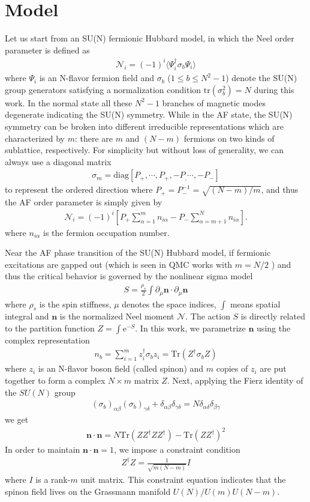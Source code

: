 \documentclass[aps,twocolumn,superscriptaddress]{revtex4-1}
\newcommand{\bea}{\begin{eqnarray}}
\newcommand{\eea}{\end{eqnarray}}
\newcommand{\bn}{\mathbf{n}}
\newcommand{\me}{\mathrm{e}}
\begin{document}
\section{Model}
Let us start from an SU(N) fermionic Hubbard model, in which the Neel order parameter is defined as \bea
\mathcal{N}_i=(-1)^i\langle \Psi_i^\dagger \sigma_b \Psi_i\rangle \eea where $\Psi_i$ is an N-flavor fermion field and
$\sigma_b$ ($1\le b\le N^2-1$) denote the SU(N) group generators satisfying a normalization condition
$\mathrm{tr}(\sigma_b^2)=N$ during this work. In the normal state all these $N^2-1$ branches of magnetic modes
degenerate indicating the SU(N) symmetry. While in the AF state, the SU(N) symmetry can be broken into different
irreducible representations which are characterized by $m$: there are $m$ and $(N-m)$ fermions on two kinds of
sublattice, respectively. For simplicity but without loss of generality, we can always use a diagonal matrix \bea
\sigma_m=\text{diag}\left[P_+,\cdots,P_+,-P_,\cdots,-P_-\right] \eea to represent the ordered direction where
$P_+=P_-^{-1}=\sqrt{(N-m)/m}$, and thus the AF order parameter is simply given by \bea
\mathcal{N}_i=(-1)^i\left[P_+\sum_{\alpha=1}^m n_{i\alpha}-P_-\sum_{\alpha=m+1}^{N}n_{i\alpha} \right]. \eea where
$n_{i\alpha}$ is the fermion occupation number. 

Near the AF phase transition of the SU(N) Hubbard model, if fermionic excitations are gapped out (which is seen in QMC
works with $m=N/2$ \cite{cai2013,wang2014}) and thus the critical behavior is governed by the nonlinear sigma model \bea
\label{eq:NLsM}S=\frac{\rho_s}{2}\int \partial_\mu\bn \cdot \partial_\mu\bn \eea where $\rho_s$ is the spin stiffness,
$\mu$ denotes the space indices, $\int$ means spatial integral and $\bn$ is the normalized Neel moment $\mathcal{N}$.
The action $S$ is directly related to the partition function $Z=\int \me^{-S}$. In this work, we parametrize $\bn$ using
the complex representation \bea \label{eq:cprep}n_b=\sum_{i=1}^m z_i^\dag \sigma_b z_i=\mathrm{Tr}(Z^\dag\sigma_b Z)
\eea where $z_i$ is an N-flavor boson field (called spinon) and $m$ copies of $z_i$ are put together to form a complex
$N\times m$ matrix $Z$. Next, applying the Fierz identity of the $SU(N)$ group \bea \label{eq:Fierz}
(\sigma_b)_{\alpha\beta}
(\sigma_b)_{\gamma\delta}+\delta_{\alpha\beta}\delta_{\gamma\delta}=N\delta_{\alpha\delta}\delta_{\beta\gamma} \eea we
get \bea \bn\cdot\bn = N\mathrm{Tr}(ZZ^\dag Z Z^\dag)-\mathrm{Tr}(ZZ^\dag)^2 \eea In order to maintain $\bn\cdot\bn=1$,
we impose a constraint condition \bea Z^\dag Z=\frac{1}{\sqrt{m(N-m)}}I \label{eq:normalizeZ}\eea where $I$ is a
rank-$m$ unit matrix. This constraint equation indicates that the spinon field lives on the Grassmann manifold
$U(N)/U(m)U(N-m)$. 
\end{document}
